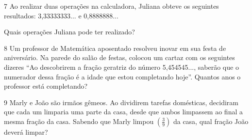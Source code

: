 
\num{7} Ao realizar duas operações na calculadora, Juliana obteve os
seguintes resultados: 3,33333333... e 0,8888888...

Quais operações Juliana pode ter realizado?










\num{8} Um professor de Matemática aposentado resolveu inovar em sua festa de
aniversário. Na parede do salão de festas, colocou um cartaz com os
seguintes dizeres ``Ao descobrirem a fração geratriz do número
5,454545..., saberão que o numerador dessa fração é a idade que estou
completando hoje''. Quantos anos o professor está completando?








\num{9} Marly e João são irmãos gêmeos. Ao dividirem tarefas domésticas,
decidiram que cada um limparia uma parte da casa, desde que ambos
limpassem ao final a mesma fração da casa. Sabendo que Marly limpou
$(\frac{3}{9})$ da casa, qual fração João deverá limpar?

\\

